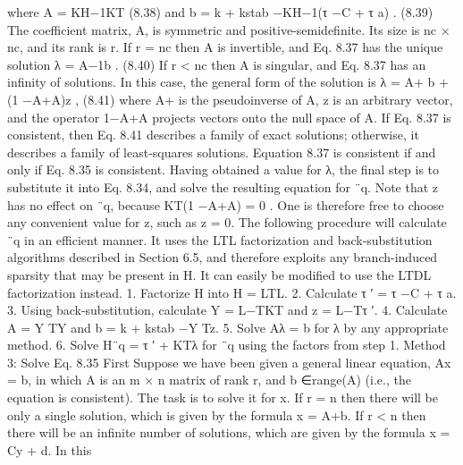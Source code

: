where A = KH−1KT (8.38) and b = k + kstab −KH−1(τ −C + τ a) . (8.39) The coefficient matrix, A, is symmetric and positive-semidefinite. Its size is nc × nc, and its rank is r. If r = nc then A is invertible, and Eq. 8.37 has the unique solution λ = A−1b . (8.40) If r < nc then A is singular, and Eq. 8.37 has an infinity of solutions. In this case, the general form of the solution is λ = A+ b + (1 −A+A)z , (8.41) where A+ is the pseudoinverse of A, z is an arbitrary vector, and the operator 1−A+A projects vectors onto the null space of A. If Eq. 8.37 is consistent, then Eq. 8.41 describes a family of exact solutions; otherwise, it describes a family of least-squares solutions. Equation 8.37 is consistent if and only if Eq. 8.35 is consistent. Having obtained a value for λ, the final step is to substitute it into Eq. 8.34, and solve the resulting equation for ¨q. Note that z has no effect on ¨q, because KT(1 −A+A) = 0 . One is therefore free to choose any convenient value for z, such as z = 0. The following procedure will calculate ¨q in an efficient manner. It uses the LTL factorization and back-substitution algorithms described in Section 6.5, and therefore exploits any branch-induced sparsity that may be present in H. It can easily be modified to use the LTDL factorization instead. 1. Factorize H into H = LTL. 2. Calculate τ ′ = τ −C + τ a. 3. Using back-substitution, calculate Y = L−TKT and z = L−Tτ ′. 4. Calculate A = Y TY and b = k + kstab −Y Tz. 5. Solve Aλ = b for λ by any appropriate method. 6. Solve H¨q = τ ′ + KTλ for ¨q using the factors from step 1. Method 3: Solve Eq. 8.35 First Suppose we have been given a general linear equation, Ax = b, in which A is an m × n matrix of rank r, and b ∈range(A) (i.e., the equation is consistent). The task is to solve it for x. If r = n then there will be only a single solution, which is given by the formula x = A+b. If r < n then there will be an infinite number of solutions, which are given by the formula x = Cy + d. In this

